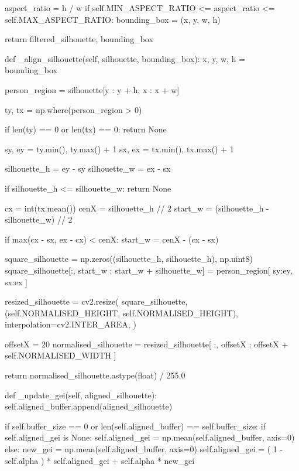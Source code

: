 \begin{appendices}
\begin{code}
            aspect_ratio = h / w
            if self.MIN_ASPECT_RATIO <= aspect_ratio <= self.MAX_ASPECT_RATIO:
                bounding_box = (x, y, w, h)

        return filtered_silhouette, bounding_box

    def _align_silhouette(self, silhouette, bounding_box):
        x, y, w, h = bounding_box

        person_region = silhouette[y : y + h, x : x + w]

        ty, tx = np.where(person_region > 0)

        if len(ty) == 0 or len(tx) == 0:
            return None

        sy, ey = ty.min(), ty.max() + 1
        sx, ex = tx.min(), tx.max() + 1

        silhouette_h = ey - sy
        silhouette_w = ex - sx

        if silhouette_h <= silhouette_w:
            return None

        cx = int(tx.mean())
        cenX = silhouette_h // 2
        start_w = (silhouette_h - silhouette_w) // 2

        if max(cx - sx, ex - cx) < cenX:
            start_w = cenX - (cx - sx)

        square_silhouette = np.zeros((silhouette_h, silhouette_h), np.uint8)
        square_silhouette[:, start_w : start_w + silhouette_w] = person_region[
            sy:ey, sx:ex
        ]

        resized_silhouette = cv2.resize(
            square_silhouette,
            (self.NORMALISED_HEIGHT, self.NORMALISED_HEIGHT),
            interpolation=cv2.INTER_AREA,
        )

        offsetX = 20
        normalised_silhouette = resized_silhouette[
            :, offsetX : offsetX + self.NORMALISED_WIDTH
        ]

        return normalised_silhouette.astype(float) / 255.0

    def _update_gei(self, aligned_silhouette):
        self.aligned_buffer.append(aligned_silhouette)

        if self.buffer_size == 0 or len(self.aligned_buffer) == self.buffer_size:
            if self.aligned_gei is None:
                self.aligned_gei = np.mean(self.aligned_buffer, axis=0)
            else:
                new_gei = np.mean(self.aligned_buffer, axis=0)
                self.aligned_gei = (
                    1 - self.alpha
                ) * self.aligned_gei + self.alpha * new_gei
    \end{code}


\end{appendices}
